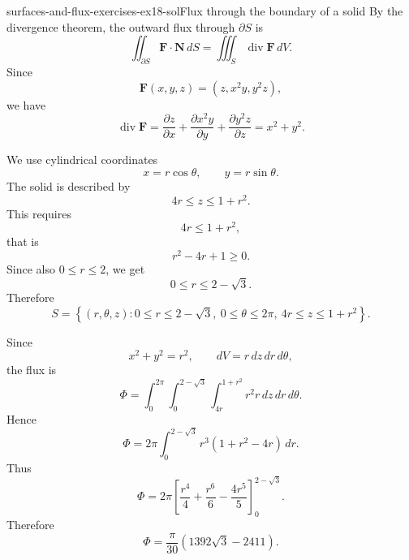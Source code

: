 \documentclass[preview]{standalone}
\begin{document}
\begin{snippetsolution}{surfaces-and-flux-exercises-ex18-sol}{Flux through the boundary of a solid}
    By the divergence theorem, the outward flux through \(\partial S\) is
    \[
        \iint_{\partial S}\mathbf{F}\cdot \mathbf{N}\,dS
        =
        \iiint_S \operatorname{div}\mathbf{F}\,dV.
    \]
    Since
    \[
        \mathbf{F}(x,y,z)=\left(z,x^2y,y^2z\right),
    \]
    we have
    \[
        \operatorname{div}\mathbf{F}
        =
        \frac{\partial z}{\partial x}
        +
        \frac{\partial x^2y}{\partial y}
        +
        \frac{\partial y^2z}{\partial z}
        =
        x^2+y^2.
    \]

    We use cylindrical coordinates
    \[
        x=r\cos\theta,
        \qquad
        y=r\sin\theta.
    \]
    The solid is described by
    \[
        4r\leq z\leq 1+r^2.
    \]
    This requires
    \[
        4r\leq 1+r^2,
    \]
    that is
    \[
        r^2-4r+1\geq 0.
    \]
    Since also \(0\leq r\leq 2\), we get
    \[
        0\leq r\leq 2-\sqrt{3}.
    \]
    Therefore
    \[
        S=
        \left\{
            (r,\theta,z):
            0\leq r\leq 2-\sqrt{3},
            \ 0\leq\theta\leq 2\pi,
            \ 4r\leq z\leq 1+r^2
        \right\}.
    \]

    Since
    \[
        x^2+y^2=r^2,
        \qquad
        dV=r\,dz\,dr\,d\theta,
    \]
    the flux is
    \[
        \Phi
        =
        \int_0^{2\pi}
        \int_0^{2-\sqrt{3}}
        \int_{4r}^{1+r^2}
        r^2r\,dz\,dr\,d\theta.
    \]
    Hence
    \[
        \Phi
        =
        2\pi
        \int_0^{2-\sqrt{3}}
        r^3(1+r^2-4r)\,dr.
    \]
    Thus
    \[
        \Phi
        =
        2\pi
        \left[
            \frac{r^4}{4}
            +
            \frac{r^6}{6}
            -
            \frac{4r^5}{5}
        \right]_0^{2-\sqrt{3}}.
    \]
    Therefore
    \[
        \Phi
        =
        \frac{\pi}{30}
        \left(
            1392\sqrt{3}-2411
        \right).
    \]
\end{snippetsolution}
\end{document}
